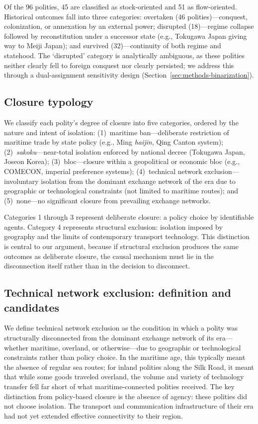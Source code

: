\documentclass[pdflatex,sn-basic]{sn-jnl}
\theoremstyle{thmstyleone}%
\theoremstyle{thmstyletwo}%
\theoremstyle{thmstylethree}%
\begin{document}
Of the 96 polities, 45 are classified as stock-oriented and 51 as flow-oriented. Historical outcomes fall into three categories: overtaken (46 polities)---conquest, colonization, or annexation by an external power; disrupted (18)---regime collapse followed by reconstitution under a successor state (e.g., Tokugawa Japan giving way to Meiji Japan); and survived (32)---continuity of both regime and statehood. The `disrupted' category is analytically ambiguous, as these polities neither clearly fell to foreign conquest nor clearly persisted; we address this through a dual-assignment sensitivity design (Section~\ref{sec:methods-binarization}).

\subsection{Closure typology}\label{sec:closure-typology}

We classify each polity's degree of closure into five categories, ordered by the nature and intent of isolation: (1)~maritime ban---deliberate restriction of maritime trade by state policy (e.g., Ming \emph{haijin}, Qing Canton system); (2)~\emph{sakoku}---near-total isolation enforced by national decree (Tokugawa Japan, Joseon Korea); (3)~bloc---closure within a geopolitical or economic bloc (e.g., COMECON, imperial preference systems); (4)~technical network exclusion---involuntary isolation from the dominant exchange network of the era due to geographic or technological constraints (not limited to maritime routes); and (5)~none---no significant closure from prevailing exchange networks.

Categories 1 through 3 represent deliberate closure: a policy choice by identifiable agents. Category 4 represents structural exclusion: isolation imposed by geography and the limits of contemporary transport technology. This distinction is central to our argument, because if structural exclusion produces the same outcomes as deliberate closure, the causal mechanism must lie in the disconnection itself rather than in the decision to disconnect.

\subsection{Technical network exclusion: definition and candidates}\label{sec:tech-exclusion}

We define technical network exclusion as the condition in which a polity was structurally disconnected from the dominant exchange network of its era---whether maritime, overland, or otherwise---due to geographic or technological constraints rather than policy choice. In the maritime age, this typically meant the absence of regular sea routes; for inland polities along the Silk Road, it meant that while some goods traveled overland, the volume and variety of technology transfer fell far short of what maritime-connected polities received. The key distinction from policy-based closure is the absence of agency: these polities did not choose isolation. The transport and communication infrastructure of their era had not yet extended effective connectivity to their region.
\end{document}
